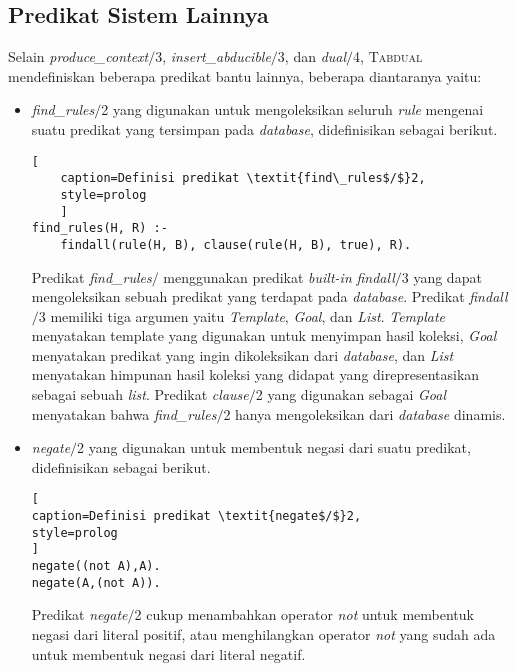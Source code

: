 \subsection{Predikat Sistem Lainnya}

Selain \textit{produce\_context$/$}3, \textit{insert\_abducible$/$}3, dan \textit{dual$/$}4, \textsc{Tabdual} mendefiniskan beberapa predikat bantu lainnya, beberapa diantaranya yaitu:

\begin{itemize}
	\item \textit{find\_rules$/$}2 yang digunakan untuk mengoleksikan seluruh \textit{rule} mengenai suatu predikat yang tersimpan pada \textit{database}, didefinisikan sebagai berikut.
	\\
	\begin{lstlisting}[
	caption=Definisi predikat \textit{find\_rules$/$}2,
	style=prolog
	]
find_rules(H, R) :-
	findall(rule(H, B), clause(rule(H, B), true), R).
	\end{lstlisting}
	
	Predikat \textit{find\_rules$/$} menggunakan predikat \textit{built-in} \textit{findall$/$}3 yang dapat mengoleksikan sebuah predikat yang terdapat pada \textit{database}. Predikat \textit{findall$/$}3 memiliki tiga argumen yaitu \textit{Template}, \textit{Goal}, dan \textit{List}. \textit{Template} menyatakan template yang digunakan untuk menyimpan hasil koleksi, \textit{Goal} menyatakan predikat yang ingin dikoleksikan dari \textit{database}, dan \textit{List} menyatakan himpunan hasil koleksi yang didapat yang direpresentasikan sebagai sebuah \textit{list}. Predikat \textit{clause$/$}2 yang digunakan sebagai \textit{Goal} menyatakan bahwa \textit{find\_rules$/$}2 hanya mengoleksikan dari \textit{database} dinamis.
	
	\item \textit{negate$/$}2 yang digunakan untuk membentuk negasi dari suatu predikat, didefinisikan sebagai berikut.
	\\
	
\begin{lstlisting}[
caption=Definisi predikat \textit{negate$/$}2,
style=prolog
]
negate((not A),A).
negate(A,(not A)).
\end{lstlisting}
	
	Predikat \textit{negate$/$}2 cukup menambahkan operator \textit{not} untuk membentuk negasi dari literal positif, atau menghilangkan operator \textit{not} yang sudah ada untuk membentuk negasi dari literal negatif.
	

\end{itemize}
